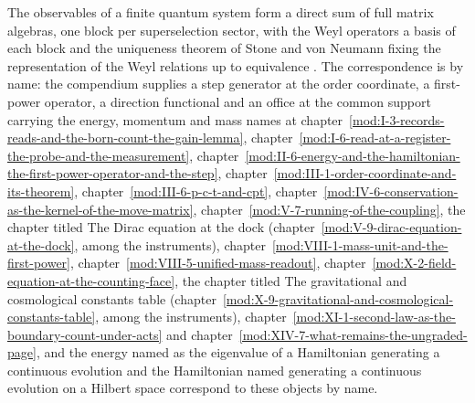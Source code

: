 \begin{chbridge}
The observables of a finite quantum system form a direct sum of full matrix algebras, one block per superselection sector, with the Weyl operators a basis of each block and the uniqueness theorem of Stone and von Neumann fixing the representation of the Weyl relations up to equivalence \cite{vonNeumann1931,Weyl1928}. The correspondence is by name: the compendium supplies a step generator at the order coordinate, a first-power operator, a direction functional and an office at the common support carrying the energy, momentum and mass names at chapter~\ref{mod:I-3-records-reads-and-the-born-count-the-gain-lemma}, chapter~\ref{mod:I-6-read-at-a-register-the-probe-and-the-measurement}, chapter~\ref{mod:II-6-energy-and-the-hamiltonian-the-first-power-operator-and-the-step}, chapter~\ref{mod:III-1-order-coordinate-and-its-theorem}, chapter~\ref{mod:III-6-p-c-t-and-cpt}, chapter~\ref{mod:IV-6-conservation-as-the-kernel-of-the-move-matrix}, chapter~\ref{mod:V-7-running-of-the-coupling}, the chapter titled The Dirac equation at the dock (chapter~\ref{mod:V-9-dirac-equation-at-the-dock}, among the instruments), chapter~\ref{mod:VIII-1-mass-unit-and-the-first-power}, chapter~\ref{mod:VIII-5-unified-mass-readout}, chapter~\ref{mod:X-2-field-equation-at-the-counting-face}, the chapter titled The gravitational and cosmological constants table (chapter~\ref{mod:X-9-gravitational-and-cosmological-constants-table}, among the instruments), chapter~\ref{mod:XI-1-second-law-as-the-boundary-count-under-acts} and chapter~\ref{mod:XIV-7-what-remains-the-ungraded-page}, and the energy named as the eigenvalue of a Hamiltonian generating a continuous evolution and the Hamiltonian named generating a continuous evolution on a Hilbert space correspond to these objects by name.
\end{chbridge}
